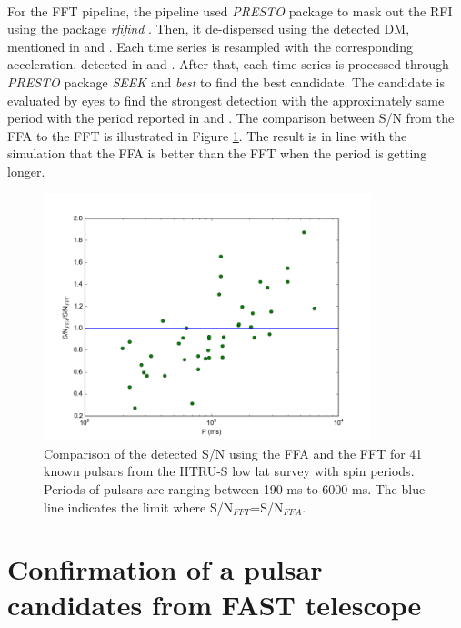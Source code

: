 \documentclass[thesis_msc.tex]{subfiles}
\begin{document}
    \paragraph{} For the FFT pipeline, the pipeline used \textit{PRESTO} package to mask out the RFI using the package \textit{rfifind} . Then, it de-dispersed using the detected DM, mentioned in \cite{Andrew} and \cite{Ng}. Each time series is resampled with the corresponding acceleration, detected in \cite{Andrew} and \cite{Ng}. After that, each time series is processed through \textit{PRESTO} package \textit{SEEK} and \textit{best} to find the best candidate. The candidate is evaluated by eyes to find the strongest detection with the approximately same period with the period reported in \cite{Andrew} and \cite{Ng}.  The comparison between S/N from the FFA to the FFT is illustrated in Figure \ref{FFA_FFT_real}. The result is in line with the simulation that the FFA is better than the FFT when the period is getting longer.  
    
  \begin{figure}[h!]
\centering
\includegraphics[width=0.85\textwidth]{figures/FFA_FFT_real.png}
\caption{Comparison of the detected S/N using the FFA and the FFT for 41 known pulsars from the HTRU-S low lat survey with spin periods. Periods of pulsars are ranging between 190 ms to 6000 ms. The blue line indicates the limit where S/N$_{FFT}$=S/N$_{FFA}.$}\label{FFA_FFT_real}
\end{figure}

    \section{Confirmation of a pulsar candidates from FAST telescope}
\end{document}
